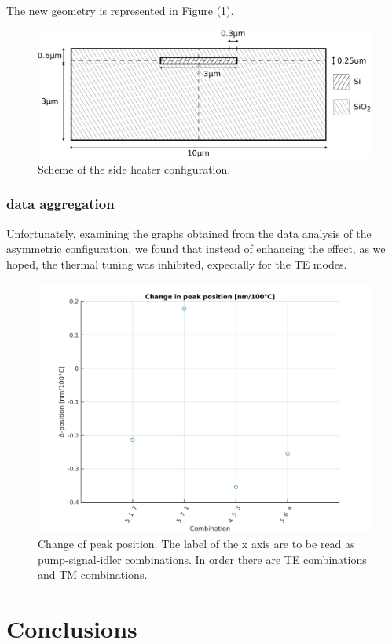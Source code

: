 \documentclass[12pt,a4paper,twoside]{article}
\begin{document}
The new geometry is represented in Figure (\ref{fig_geometry_asym}).
\begin{figure}[!ht]
	\centering
	\includegraphics[width=.9\textwidth]{geometryA.pdf}
	\caption{Scheme of the side heater configuration.}
	\label{fig_geometry_asym}
\end{figure}

\subsubsection{data aggregation}
Unfortunately, examining the graphs obtained from the data analysis of the asymmetric configuration, we found that instead of enhancing the effect, as we hoped, the thermal tuning was inhibited, expecially for the TE modes.

\begin{figure}[!hb]
	\centering
	\includegraphics[width=.75\textwidth]{asym_ppc2.png}
	\caption{Change of peak position. The label of the x axis are to be read as pump-signal-idler combinations. In order there are TE combinations and TM combinations.}
	\label{fig_asym_ppc2} %
\end{figure}

\section{Conclusions}
\end{document}
